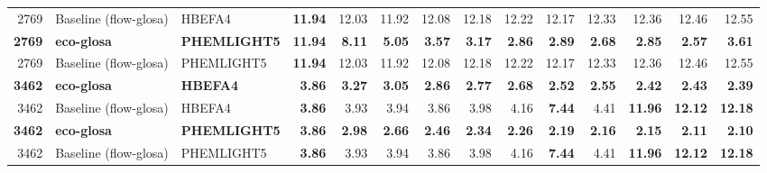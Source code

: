 \begin{table}[htb]
{\begin{tabular}{r l l r *{10}{r}}
    2769 & Baseline (\ac{flow-glosa}) & HBEFA4 & \textbf{11.94} & 12.03 & 11.92 & 12.08 & 12.18 & 12.22 & 12.17 & 12.33 & 12.36 & 12.46 & 12.55\\
    \textbf{2769} & \textbf{\ac{eco-glosa}} & \textbf{PHEMLIGHT5} & \textbf{11.94} & \textbf{8.11} & \textbf{5.05} & \textbf{3.57} & \textbf{3.17} & \textbf{2.86} & \textbf{2.89} & \textbf{2.68} & \textbf{2.85} & \textbf{2.57} & \textbf{3.61}\\
    2769 & Baseline (\ac{flow-glosa}) & PHEMLIGHT5 & \textbf{11.94} & 12.03 & 11.92 & 12.08 & 12.18 & 12.22 & 12.17 & 12.33 & 12.36 & 12.46 & 12.55\\
    \midrule
    \textbf{3462} & \textbf{\ac{eco-glosa}} & \textbf{HBEFA4} & \textbf{3.86} & \textbf{3.27} & \textbf{3.05} & \textbf{2.86} & \textbf{2.77} & \textbf{2.68} & \textbf{2.52} & \textbf{2.55} & \textbf{2.42} & \textbf{2.43} & \textbf{2.39}\\
    3462 & Baseline (\ac{flow-glosa}) & HBEFA4 & \textbf{3.86} & 3.93 & 3.94 & 3.86 & 3.98 & 4.16 & \textbf{7.44} & 4.41 & \textbf{11.96} & \textbf{12.12} & \textbf{12.18}\\
    \textbf{3462} & \textbf{\ac{eco-glosa}} & \textbf{PHEMLIGHT5} & \textbf{3.86} & \textbf{2.98} & \textbf{2.66} & \textbf{2.46} & \textbf{2.34} & \textbf{2.26} & \textbf{2.19} & \textbf{2.16} & \textbf{2.15} & \textbf{2.11} & \textbf{2.10}\\
    3462 & Baseline (\ac{flow-glosa}) & PHEMLIGHT5 & \textbf{3.86} & 3.93 & 3.94 & 3.86 & 3.98 & 4.16 & \textbf{7.44} & 4.41 & \textbf{11.96} & \textbf{12.12} & \textbf{12.18}\\
    \bottomrule
  \end{tabular}
  }
\end{table}